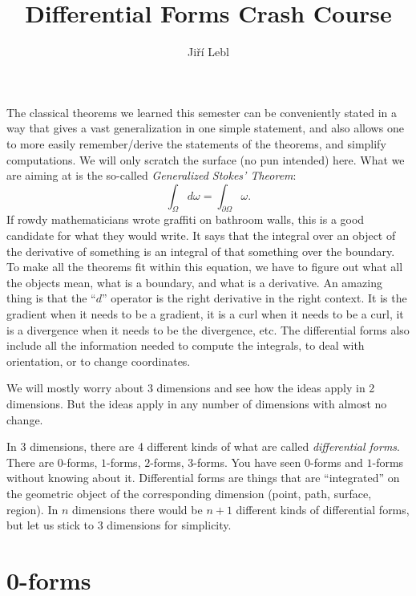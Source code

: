 \documentclass[12pt]{article}
\title{Differential Forms Crash Course}
\author{Ji\v{r}\'i Lebl}
\begin{document}
\maketitle


The classical theorems we learned this semester can be conveniently stated
in a way that gives a vast generalization in one simple statement,
and also allows one to more easily remember/derive the statements of the
theorems, and simplify computations.
We will only scratch the surface (no pun intended) here.  What we are aiming at
is the so-called \emph{Generalized Stokes' Theorem}:
\[
\int_\Omega d \omega = \int_{\partial \Omega} \omega .
\]
If rowdy mathematicians wrote graffiti on bathroom walls, this is a good
candidate for what they would write.
It says that the integral over an object of the derivative of something
is an integral of that something over the boundary.  To make all the theorems
fit within this equation, we have to figure out what all the objects mean, what is
a boundary, and what is a derivative.  An amazing thing is that
the ``$d$'' operator is the right derivative in the right context.
It is the gradient when it needs to be a gradient, it is a curl when it needs
to be a curl, it is a divergence when it needs to be the divergence, etc.
The differential forms also include all the information needed to compute
the integrals, to deal with orientation, or to change coordinates.

We will mostly worry about 3 dimensions and see how the ideas apply in 2
dimensions.  But the ideas apply in any number of dimensions with almost
no change.

In 3 dimensions, there are 4
different kinds of what are called \emph{differential forms}.
There are $0$-forms, $1$-forms, $2$-forms,
$3$-forms.  You have seen $0$-forms and $1$-forms without knowing
about it.  Differential forms are things that are ``integrated'' on the
geometric object of the corresponding dimension (point, path, surface,
region).  In $n$ dimensions there would be $n+1$ different kinds of
differential forms, but let us stick to 3 dimensions for simplicity.

\section*{0-forms}
\end{document}
